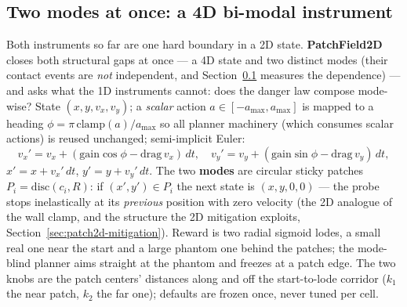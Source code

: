 \documentclass[11pt]{article}
\theoremstyle{definition}
\theoremstyle{remark}
\begin{document}
\subsection{Two modes at once: a 4D bi-modal instrument}
\label{sec:patch2d}

Both instruments so far are one hard boundary in a 2D state. \textbf{PatchField2D} closes both structural gaps at once --- a 4D state and two distinct modes (their contact events are \emph{not} independent, and Section~\ref{sec:patch2d} measures the dependence) --- and asks what the 1D instruments cannot: does the danger law compose mode-wise? State $(x, y, v_x, v_y)$; a \emph{scalar} action $a \in [-a_{\max}, a_{\max}]$ is mapped to a heading $\phi = \pi\,\mathrm{clamp}(a)/a_{\max}$ so all planner machinery (which consumes scalar actions) is reused unchanged; semi-implicit Euler:
\[
v_x' = v_x + (\mathrm{gain}\cos\phi - \mathrm{drag}\,v_x)\,dt, \quad
v_y' = v_y + (\mathrm{gain}\sin\phi - \mathrm{drag}\,v_y)\,dt,
\]
$x' = x + v_x'\,dt$, $y' = y + v_y'\,dt$. The two \textbf{modes} are circular sticky patches $P_i = \mathrm{disc}(c_i, R)$: if $(x', y') \in P_i$ the next state is $(x, y, 0, 0)$ --- the probe stops inelastically at its \emph{previous} position with zero velocity (the 2D analogue of the wall clamp, and the structure the 2D mitigation exploits, Section~\ref{sec:patch2d-mitigation}). Reward is two radial sigmoid lodes, a small real one near the start and a large phantom one behind the patches; the mode-blind planner aims straight at the phantom and freezes at a patch edge. The two knobs are the patch centers' distances along and off the start-to-lode corridor ($k_1$ the near patch, $k_2$ the far one); defaults are frozen once, never tuned per cell.
\end{document}
